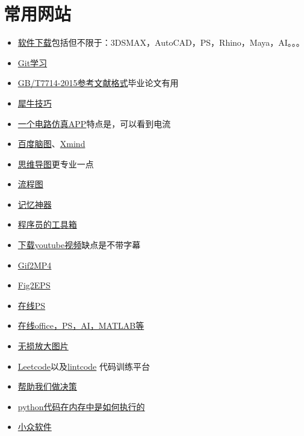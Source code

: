 \documentclass[UTF8,oneside]{ctexbook}
\begin{document}
\section{常用网站}
\begin{itemize}
	\item \href{https://www.3d66.com/popsoft_26.html}{软件下载}包括但不限于：3DSMAX，AutoCAD，PS，Rhino，Maya，AI。。。
	\item \href{http://gitbook.liuhui998.com/index.html}{Git学习} 
	\item \href{http://www.latexstudio.net/archives/6888.html}{GB/T7714-2015参考文献格式}毕业论文有用
	\item \href{http://www.xuexiniu.com/forum.php?mod=forumdisplay&fid=102&filter=typeid&typeid=1}{犀牛技巧}
	\item \href{https://www.52pojie.cn/thread-716675-1-1.html}{一个电路仿真APP}特点是，可以看到电流
	\item \href{http://naotu.baidu.com/file/97d9cd5ca30672903a3e3321e62c6ed8}{百度脑图}、\href{https://github.com/lonelybag/pwc}{Xmind}
	\item \href{https://mm.edrawsoft.cn/map.html?obj=wxoa3v5wBLcpmgCifx59_Uzk5X4qHU/Personal/未命名文件.emmx}{思维导图}更专业一点
	\item \href{https://www.processon.com/login;jsessionid=022BCDCA031DD3C240BE7FD87D942F03.jvm1?backUrl=/diagraming/5be7a513e4b0d74dc539976e}{流程图}
	\item \href{https://ankiweb.net/shared/decks/}{记忆神器}
	\item \href{https://tool.lu}{程序员的工具箱}
	\item \href{http://www.ytube.win}{下载youtube视频}缺点是不带字幕
	\item \href{https://cloudconvert.com/gif-to-mp4}{Gif2MP4}
	\item \href{https://cn.office-converter.com/FIG-to-EPS}{Fig2EPS}
	\item \href{https://www.photopea.com}{在线PS}
	\item \href{https://uzer.me/u/signin}{在线office，PS，AI，MATLAB等}
	\item \href{https://bigjpg.com}{无损放大图片}
	\item \href{https://leetcode.com}{Leetcode}以及\href{https://www.lintcode.com/zh-cn/accounts/signup/}{lintcode} 代码训练平台
	\item \href{https://www.slant.co}{帮助我们做决策}
	\item \href{http://www.pythontutor.com}{python代码在内存中是如何执行的}
	\item \href{https://www.appinn.com/category/windows/}{小众软件}

\end{itemize}
\end{document}
